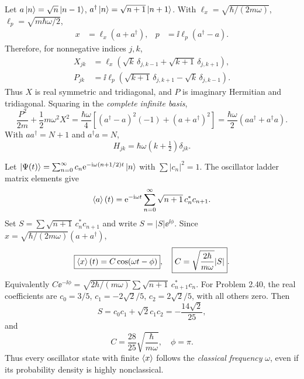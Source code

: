 Let $a\left|n\right\rangle=\sqrt n\left|n-1\right\rangle$,
$a^\dagger\left|n\right\rangle=\sqrt{n+1}\left|n+1\right\rangle$.
With $\ell_x=\sqrt{\hbar/(2m\omega)}$,
$\ell_p=\sqrt{m\hbar\omega/2}$,
\begin{align}
x&=\ell_x(a+a^\dagger),&
p&=\ii\ell_p(a^\dagger-a).
\end{align}
Therefore, for nonnegative indices $j,k$,
\begin{align}
\boxed{X_{jk}}&=
\ell_x(\sqrt{k}\,\delta_{j,k-1}
+\sqrt{k+1}\,\delta_{j,k+1}),\\
\boxed{P_{jk}}&=
\ii\ell_p(\sqrt{k+1}\,\delta_{j,k+1}
-\sqrt{k}\,\delta_{j,k-1}).
\end{align}
Thus $X$ is real symmetric and tridiagonal,
and $P$ is imaginary Hermitian and tridiagonal.
Squaring in the \emph{complete infinite basis},
\begin{equation}
\frac{P^2}{2m}+\frac12m\omega^2X^2
=\frac{\hbar\omega}{4}
[(a^\dagger-a)^2(-1)+(a+a^\dagger)^2]
=\frac{\hbar\omega}{2}(aa^\dagger+a^\dagger a).
\end{equation}
With $aa^\dagger=N+1$ and $a^\dagger a=N$,
\begin{equation}
\boxed{H_{jk}=\hbar\omega(k+\tfrac12)\delta_{jk}}.
\end{equation}

Let
$\left|\Psi(t)\right\rangle=\sum_{n=0}^\infty
c_n\mathrm{e}^{-\mathrm{i}\omega(n+1/2)t}\left|n\right\rangle$
with $\sum|c_n|^2=1$.
The oscillator ladder matrix elements give
\begin{equation}
\left\langle a\right\rangle(t)=\mathrm{e}^{-\mathrm{i}\omega t}
\sum_{n=0}^\infty\sqrt{n+1}\,c_n^*c_{n+1}.
\end{equation}
Set $S=\sum\sqrt{n+1}\,c_n^*c_{n+1}$
and write
$S=|S|\ee^{\ii\phi}$.
Since
$x=\sqrt{\hbar/(2m\omega)}(a+a^\dagger)$,
\begin{equation}
\boxed{\left\langle x\right\rangle(t)=C\cos(\omega t-\phi)},
\quad
\boxed{C=\sqrt{\frac{2\hbar}{m\omega}}|S|}.
\end{equation}
Equivalently
$C\ee^{-\ii\phi}=
\sqrt{2\hbar/(m\omega)}
\sum\sqrt{n+1}\,c_{n+1}^*c_n$.
For Problem 2.40, the real coefficients are
$c_0=3/5$, $c_1=-2\sqrt2/5$,
$c_2=2\sqrt2/5$, with all others zero.
Then
\begin{equation}
S=c_0c_1+\sqrt2c_1c_2
=-\frac{14\sqrt2}{25},
\end{equation}
and
\begin{equation}
\boxed{C=\frac{28}{25}
\sqrt{\frac{\hbar}{m\omega}},\quad \phi=\pi}.
\end{equation}
Thus every oscillator state with finite
$\left\langle x\right\rangle$ follows the \emph{classical
frequency} $\omega$, even if its
probability density is highly nonclassical.
